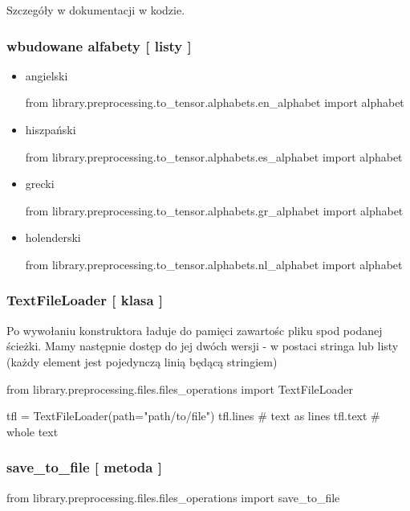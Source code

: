 Szczegóły w dokumentacji w kodzie.


\subsubsection{wbudowane alfabety [ listy ] }

\begin{itemize} 

\item angielski
\begin{import}
from library.preprocessing.to_tensor.alphabets.en_alphabet import alphabet
\end{import}


\item hiszpański
\begin{import}
from library.preprocessing.to_tensor.alphabets.es_alphabet import alphabet
\end{import}


\item grecki
\begin{import}
from library.preprocessing.to_tensor.alphabets.gr_alphabet import alphabet
\end{import}


\item holenderski
\begin{import}
from library.preprocessing.to_tensor.alphabets.nl_alphabet import alphabet
\end{import}
\end{itemize}


\subsubsection{TextFileLoader [ klasa ] }
Po wywołaniu konstruktora ładuje do pamięci zawartośc pliku spod podanej ścieżki. Mamy następnie 
dostęp do jej dwóch wersji - w postaci stringa lub listy (każdy element jest pojedynczą 
linią będącą stringiem)


\begin{python}
from library.preprocessing.files.files_operations import TextFileLoader

tfl = TextFileLoader(path="path/to/file")
tfl.lines  # text as lines
tfl.text   # whole text
\end{python}

\subsubsection{save\_to\_file [ metoda ] }
\begin{import}
from library.preprocessing.files.files_operations import save_to_file
\end{import}

